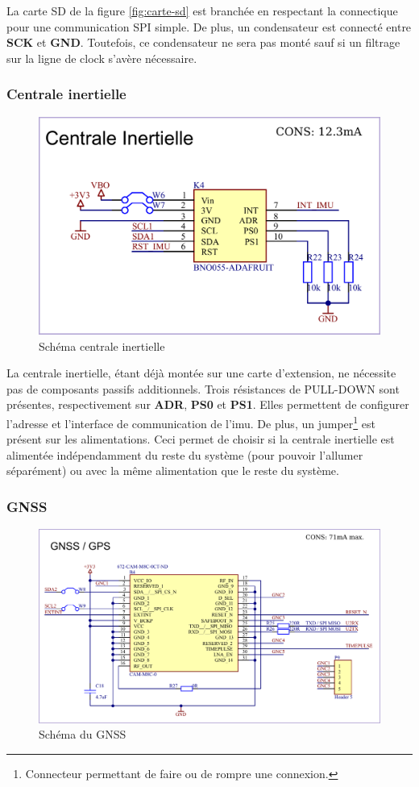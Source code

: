 La carte SD de la figure \ref{fig:carte-sd} est branchée en respectant la connectique pour une communication SPI simple. De plus, un condensateur est connecté entre \textbf{SCK} et \textbf{GND}. Toutefois, ce condensateur ne sera pas monté sauf si un filtrage sur la ligne de clock s'avère nécessaire.


\subsubsection{Centrale inertielle}

\begin{figure}[h]
	\centering
	\includegraphics[width=0.5\linewidth]{../figures/etude/sch/IMU}
	\caption{Schéma centrale inertielle}
	\label{fig:imu}
\end{figure}

La centrale inertielle, étant déjà montée sur une carte d'extension, ne nécessite pas de composants passifs additionnels. Trois résistances de PULL-DOWN sont présentes, respectivement sur \textbf{ADR}, \textbf{PS0} et \textbf{PS1}. Elles permettent de configurer l'adresse et l'interface de communication de l'\gls{imu}. De plus, un jumper\footnote{Connecteur permettant de faire ou de rompre une connexion.} est présent sur les alimentations. Ceci permet de choisir si la centrale inertielle est alimentée indépendamment du reste du système (pour pouvoir l'allumer séparément) ou avec la même alimentation que le reste du système.


\subsubsection{GNSS}
\begin{figure}[h]
	\centering
	\includegraphics[width=.6\linewidth]{../figures/etude/sch/GNSS}
	\caption{Schéma du \gls{GNSS}}
	\label{fig:gnss}
\end{figure}

